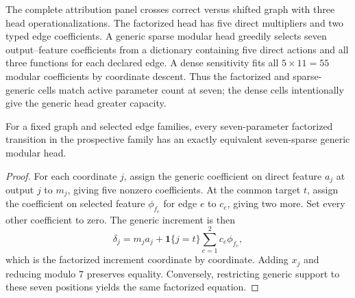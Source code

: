 The complete attribution panel crosses correct versus shifted graph with three
head operationalizations.  The factorized head has five direct multipliers and
two typed edge coefficients.  A generic sparse modular head greedily selects
seven output--feature coefficients from a dictionary containing five direct
actions and all three functions for each declared edge.  A dense sensitivity
fits all \(5\times11=55\) modular coefficients by coordinate descent.  Thus the
factorized and sparse-generic cells match active parameter count at seven;
the dense cells intentionally give the generic head greater capacity.

\begin{proposition}
For a fixed graph and selected edge families, every seven-parameter factorized
transition in the prospective family has an exactly equivalent seven-sparse
generic modular head.
\end{proposition}
\begin{proof}
For each coordinate \(j\), assign the generic coefficient on direct feature
\(a_j\) at output \(j\) to \(m_j\), giving five nonzero coefficients.  At the
common target \(t\), assign the coefficient on selected feature
\(\phi_{f_e}\) for edge \(e\) to \(c_e\), giving two more.  Set every other
coefficient to zero.  The generic increment is then
\[
\delta_j=m_j a_j+\mathbf 1\{j=t\}\sum_{e=1}^{2}c_e\phi_{f_e},
\]
which is the factorized increment coordinate by coordinate.  Adding \(x_j\)
and reducing modulo 7 preserves equality.  Conversely, restricting generic
support to these seven positions yields the same factorized equation.
\end{proof}

